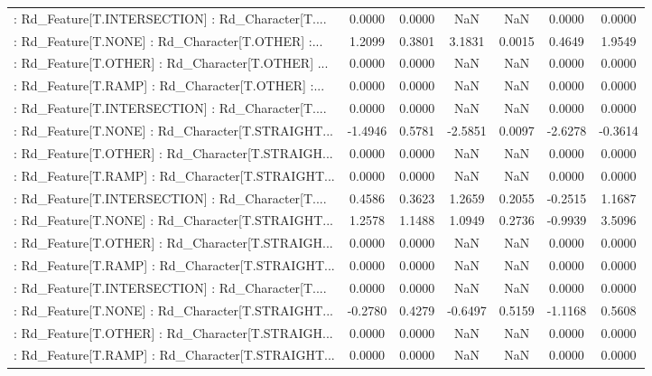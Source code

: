 \begin{longtable}{p{4cm}cccccc}
 : Rd\_Feature[T.INTERSECTION] : Rd\_Character[T.... &  0.0000 &    0.0000 &     NaN &          NaN &  0.0000 &  0.0000 \\
 : Rd\_Feature[T.NONE] : Rd\_Character[T.OTHER] :... &  1.2099 &    0.3801 &  3.1831 &       0.0015 &  0.4649 &  1.9549 \\
 : Rd\_Feature[T.OTHER] : Rd\_Character[T.OTHER] ... &  0.0000 &    0.0000 &     NaN &          NaN &  0.0000 &  0.0000 \\
 : Rd\_Feature[T.RAMP] : Rd\_Character[T.OTHER] :... &  0.0000 &    0.0000 &     NaN &          NaN &  0.0000 &  0.0000 \\
 : Rd\_Feature[T.INTERSECTION] : Rd\_Character[T.... &  0.0000 &    0.0000 &     NaN &          NaN &  0.0000 &  0.0000 \\
 : Rd\_Feature[T.NONE] : Rd\_Character[T.STRAIGHT... & -1.4946 &    0.5781 & -2.5851 &       0.0097 & -2.6278 & -0.3614 \\
 : Rd\_Feature[T.OTHER] : Rd\_Character[T.STRAIGH... &  0.0000 &    0.0000 &     NaN &          NaN &  0.0000 &  0.0000 \\
 : Rd\_Feature[T.RAMP] : Rd\_Character[T.STRAIGHT... &  0.0000 &    0.0000 &     NaN &          NaN &  0.0000 &  0.0000 \\
 : Rd\_Feature[T.INTERSECTION] : Rd\_Character[T.... &  0.4586 &    0.3623 &  1.2659 &       0.2055 & -0.2515 &  1.1687 \\
 : Rd\_Feature[T.NONE] : Rd\_Character[T.STRAIGHT... &  1.2578 &    1.1488 &  1.0949 &       0.2736 & -0.9939 &  3.5096 \\
 : Rd\_Feature[T.OTHER] : Rd\_Character[T.STRAIGH... &  0.0000 &    0.0000 &     NaN &          NaN &  0.0000 &  0.0000 \\
 : Rd\_Feature[T.RAMP] : Rd\_Character[T.STRAIGHT... &  0.0000 &    0.0000 &     NaN &          NaN &  0.0000 &  0.0000 \\
 : Rd\_Feature[T.INTERSECTION] : Rd\_Character[T.... &  0.0000 &    0.0000 &     NaN &          NaN &  0.0000 &  0.0000 \\
 : Rd\_Feature[T.NONE] : Rd\_Character[T.STRAIGHT... & -0.2780 &    0.4279 & -0.6497 &       0.5159 & -1.1168 &  0.5608 \\
 : Rd\_Feature[T.OTHER] : Rd\_Character[T.STRAIGH... &  0.0000 &    0.0000 &     NaN &          NaN &  0.0000 &  0.0000 \\
 : Rd\_Feature[T.RAMP] : Rd\_Character[T.STRAIGHT... &  0.0000 &    0.0000 &     NaN &          NaN &  0.0000 &  0.0000 \\

\end{longtable}
